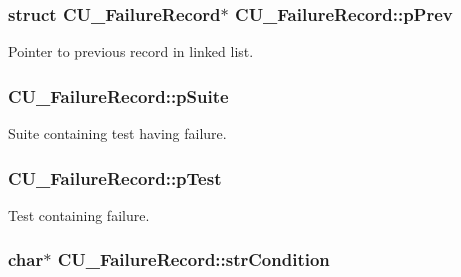 \hypertarget{structCU__FailureRecord_a617e40c3052b6b7cf3a873296ed27e56}{
\subsubsection[{p\-Prev}]{\setlength{\rightskip}{0pt plus 5cm}struct {\bf C\-U\-\_\-\-Failure\-Record}$\ast$ C\-U\-\_\-\-Failure\-Record\-::p\-Prev}}\label{structCU__FailureRecord_a617e40c3052b6b7cf3a873296ed27e56}


Pointer to previous record in linked list. 

\hypertarget{structCU__FailureRecord_a773e1afb22505c6fc487043222617731}{
\subsubsection[{p\-Suite}]{ C\-U\-\_\-\-Failure\-Record\-::p\-Suite}}\label{structCU__FailureRecord_a773e1afb22505c6fc487043222617731}


Suite containing test having failure. 

\hypertarget{structCU__FailureRecord_ad1c88882d83b15d2c2d73a8562f8fced}{
\subsubsection[{p\-Test}]{ C\-U\-\_\-\-Failure\-Record\-::p\-Test}}\label{structCU__FailureRecord_ad1c88882d83b15d2c2d73a8562f8fced}


Test containing failure. 

\hypertarget{structCU__FailureRecord_a645edad1e32b1533bd55c501b2c4d591}{
\subsubsection[{str\-Condition}]{\setlength{\rightskip}{0pt plus 5cm}char$\ast$ C\-U\-\_\-\-Failure\-Record\-::str\-Condition}}\label{structCU__FailureRecord_a645edad1e32b1533bd55c501b2c4d591}


